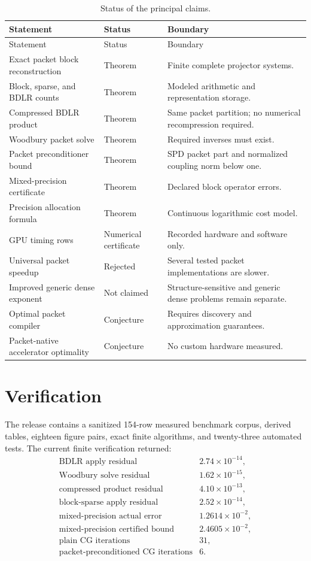 \documentclass[11pt]{article}
\theoremstyle{definition}
\theoremstyle{remark}
\begin{document}
\begin{longtable}{L{0.34\textwidth}L{0.20\textwidth}L{0.37\textwidth}}
\caption{Status of the principal claims.}\label{tab:claims}\\
\toprule
Statement & Status & Boundary\\
\midrule
\endfirsthead
\toprule
Statement & Status & Boundary\\
\midrule
\endhead
Exact packet block reconstruction & Theorem & Finite complete projector systems.\\
Block, sparse, and BDLR counts & Theorem & Modeled arithmetic and representation storage.\\
Compressed BDLR product & Theorem & Same packet partition; no numerical recompression required.\\
Woodbury packet solve & Theorem & Required inverses must exist.\\
Packet preconditioner bound & Theorem & SPD packet part and normalized coupling norm below one.\\
Mixed-precision certificate & Theorem & Declared block operator errors.\\
Precision allocation formula & Theorem & Continuous logarithmic cost model.\\
GPU timing rows & Numerical certificate & Recorded hardware and software only.\\
Universal packet speedup & Rejected & Several tested packet implementations are slower.\\
Improved generic dense exponent & Not claimed & Structure-sensitive and generic dense problems remain separate.\\
Optimal packet compiler & Conjecture & Requires discovery and approximation guarantees.\\
Packet-native accelerator optimality & Conjecture & No custom hardware measured.\\
\bottomrule
\end{longtable}

\section{Verification}

The release contains a sanitized 154-row measured benchmark corpus, derived tables, eighteen figure pairs, exact finite algorithms, and twenty-three automated tests. The current finite verification returned:
\[
\begin{array}{lr}
\text{BDLR apply residual} & 2.74\times10^{-14},\\
\text{Woodbury solve residual} & 1.62\times10^{-15},\\
\text{compressed product residual} & 4.10\times10^{-13},\\
\text{block-sparse apply residual} & 2.52\times10^{-14},\\
\text{mixed-precision actual error} & 1.2614\times10^{-2},\\
\text{mixed-precision certified bound} & 2.4605\times10^{-2},\\
\text{plain CG iterations} & 31,\\
\text{packet-preconditioned CG iterations} & 6.
\end{array}
\]
\end{document}

